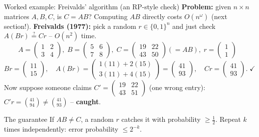 \documentclass[11pt,aspectratio=169]{beamer}
\begin{document}
\begin{frame}{Worked example: Freivalds' algorithm (an RP-style check)}
  \textbf{Problem:} given $n\times n$ matrices $A, B, C$, is $C = AB$? Computing $AB$
  directly costs $O(n^\omega)$ (next section!). \textbf{Freivalds (1977):} pick a
  random $r \in \{0,1\}^n$ and just check $A(Br) \overset{?}{=} Cr$ -- $O(n^2)$ time.
  \[
    A = \begin{pmatrix}1&2\\3&4\end{pmatrix},\;
    B = \begin{pmatrix}5&6\\7&8\end{pmatrix},\;
    C = \begin{pmatrix}19&22\\43&50\end{pmatrix} (= AB),\;
    r = \begin{pmatrix}1\\1\end{pmatrix}
  \]
  \[
    Br = \begin{pmatrix}11\\15\end{pmatrix}, \quad
    A(Br) = \begin{pmatrix}1(11)+2(15)\\3(11)+4(15)\end{pmatrix} =
    \begin{pmatrix}41\\93\end{pmatrix}, \quad
    Cr = \begin{pmatrix}41\\93\end{pmatrix}. \; \checkmark
  \]
  Now suppose someone claims $C' = \left(\begin{smallmatrix}19&22\\43&51\end{smallmatrix}\right)$
  (one wrong entry): $C'r = \binom{41}{94} \ne \binom{41}{93}$ -- \textbf{caught}.
  \begin{exampleblock}{The guarantee}
    If $AB \ne C$, a random $r$ catches it with probability $\ge \tfrac12$. Repeat $k$
    times independently: error probability $\le 2^{-k}$.
  \end{exampleblock}
\end{frame}
\end{document}
